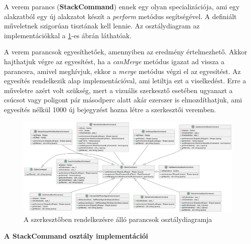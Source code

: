 A verem parancs (\textbf{StackCommand}) ennek egy olyan specializációja, ami egy alakzatból egy új alakzatot készít a \textit{perform} metódus segítségével. A definiált műveletnek szigorúan tisztának kell lennie. Az osztálydiagram az implementációkkal a \ref{fig:class_editor_command-1}-es ábrán láthatóak.

A verem parancsok egyesíthetőek, amennyiben az eredmény értelmezhető. Akkor hajthatjuk végre az egyesítést, ha a \textit{canMerge} metódus igazat ad vissza a parancsra, amivel meghívjuk, ekkor a \textit{merge} metódus végzi el az egyesítést. Az egyesítés rendelkezik alap implementációval, ami letiltja ezt a viselkedést. Erre a műveletre azért volt szükség, mert a vizuális szerkesztő esetében ugyanazt a csúcsot vagy poligont pár másodperc alatt akár ezerszer is elmozdíthatjuk, ami egyesítés nélkül 1000 új bejegyzést hozna létre a szerkesztői veremben.

\begin{figure}[H]
	\centering
	\includegraphics[width=1\linewidth]{images/class_editor_command.png}
	\caption{A szerkesztőben rendelkezésre álló parancsok osztálydiagramja}
	\label{fig:class_editor_command-1}
\end{figure}

\textbf{A StackCommand osztály implementációi}

